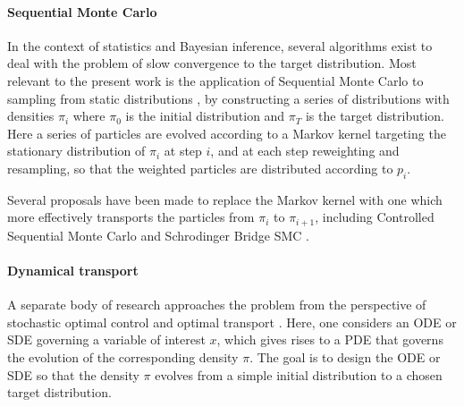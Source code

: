 \documentclass{article}
\begin{document}
\paragraph{Sequential Monte Carlo}
In the context of statistics and Bayesian inference, several algorithms exist to deal with the problem of slow convergence to the target distribution. Most relevant to the present work is the application of Sequential Monte Carlo \cite{doucet2001introduction} to sampling from static distributions \cite{del2006sequential}, by constructing a series of distributions with densities $\pi_i$ where $\pi_0$ is the initial distribution and $\pi_T$ is the target distribution. Here a series of particles are evolved according to a Markov kernel targeting the stationary distribution of $\pi_i$ at step $i$, and at each step reweighting and resampling, so that the weighted particles are distributed according to $p_i$.

Several proposals have been made to replace the Markov kernel with one which more effectively transports the particles from $\pi_i$ to $\pi_{i+1}$, including Controlled Sequential Monte Carlo \cite{heng2020controlled} and Schrodinger Bridge SMC \cite{bernton2019schr}.











\paragraph{Dynamical transport} A separate body of research approaches the problem from the perspective of stochastic optimal control \cite{fleming2012deterministic} and optimal transport \cite{peyre2019computational}. Here, one considers an ODE or SDE governing a variable of interest $x$, which gives rises to a PDE that governs the evolution of the corresponding density $\pi$. The goal is to design the ODE or SDE so that the density $\pi$ evolves from a simple initial distribution to a chosen target distribution.
\end{document}
